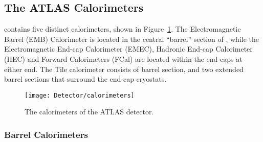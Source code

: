 %
%
%
%
%
%
%
%
%
%
%
%
%
%
%
%
%

\subsection{The ATLAS Calorimeters}



\atlas contains five distinct calorimeters, shown in Figure~\ref{fig_calorimeters}. The Electromagnetic Barrel (EMB) Calorimeter is located in the central ``barrel'' section of \atlas, while the Electromagnetic End-cap Calorimeter (EMEC), Hadronic End-cap Calorimeter (HEC) and Forward Calorimeters (FCal) are located within the end-caps at either end. The Tile calorimeter consists of barrel section, and two extended barrel sections that surround the end-cap cryostats.
\begin{figure}[tb]
\begin{center}
\texttt{[image: Detector/calorimeters]}
\end{center}
\caption{The calorimeters of the ATLAS detector.}
\label{fig_calorimeters}
\end{figure}
\subsubsection{Barrel Calorimeters}

%
%

